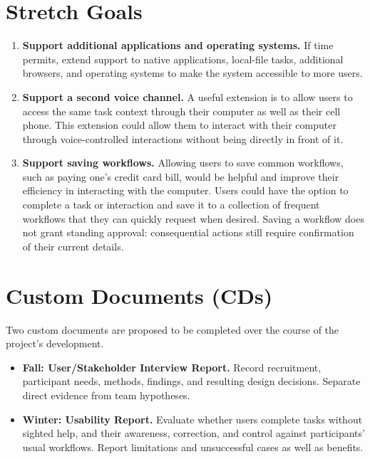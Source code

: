 \documentclass[11pt]{article}
\begin{document}
\section{Stretch Goals}
\begin{enumerate}[label=SG\arabic*.,leftmargin=*]
\item \textbf{Support additional applications and operating systems.}
If time permits, extend support to native applications, local-file tasks,
additional browsers, and operating systems to make the system accessible to more users.

\item \textbf{Support a second voice channel.}
A useful extension is to allow users to access the same task context through their computer as well as their cell phone. This extension
could allow them to interact with their computer through voice-controlled interactions without being directly in front of it.

\item \textbf{Support saving workflows.}
Allowing users to save common workflows, such as paying one's credit card bill, would be helpful and improve their efficiency in
interacting with the computer. Users could have the option to complete a task or interaction and save it to a collection of frequent workflows
that they can quickly request when desired. Saving a workflow does not grant
standing approval: consequential actions still require confirmation of their
current details.

\end{enumerate}

\section{Custom Documents (CDs)}
Two custom documents are proposed to be completed over the course of the project's development.
\begin{itemize}
\item \textbf{Fall: User/Stakeholder Interview Report.} Record recruitment,
participant needs, methods, findings, and resulting design decisions.
Separate direct evidence from team hypotheses.
\item \textbf{Winter: Usability Report.} Evaluate whether users complete tasks without sighted help,
and their awareness, correction, and control against participants' usual
workflows. Report limitations and unsuccessful cases as well as benefits.
\end{itemize}
\end{document}
